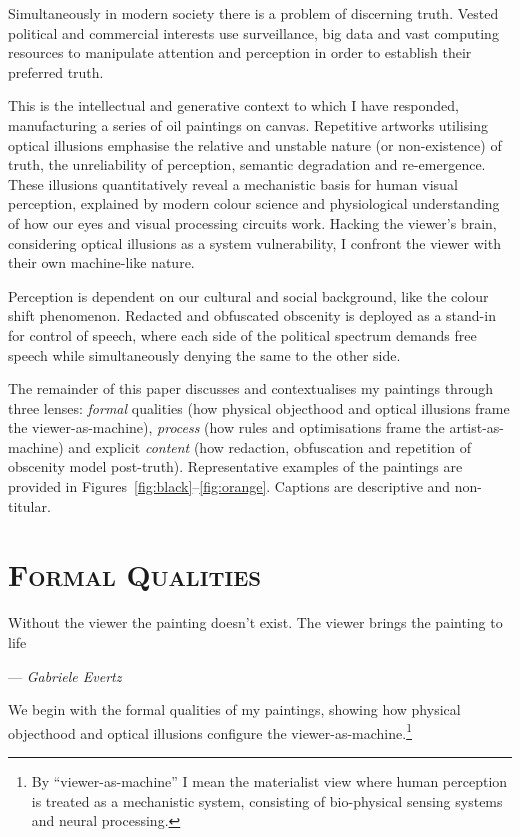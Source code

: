 \documentclass[12pt]{article}
\newcommand{\epigraphsource}[1]{--- {\small{\textit{#1}}}}
\begin{document}
Simultaneously in modern society there is a problem of discerning
truth.\autocite{keyes2004posttruth,mcintyre2018posttruth} Vested
political and commercial interests use surveillance, big data and vast
computing resources to manipulate attention and perception in order to
establish their preferred truth.

This is the intellectual and generative context to which I have
responded, manufacturing a series of oil paintings on
canvas. Repetitive artworks utilising optical illusions emphasise the
relative and unstable nature (or non-existence) of truth, the
unreliability of perception, semantic degradation and
re-emergence. These illusions quantitatively reveal a mechanistic
basis for human visual perception, explained by modern colour science
and physiological understanding of how our eyes and visual processing
circuits work. Hacking the viewer's brain, considering optical
illusions as a system vulnerability, I confront the viewer with their
own machine-like nature.

Perception is dependent on our cultural and social background, like
the colour shift phenomenon. Redacted and obfuscated obscenity is
deployed as a stand-in for control of speech, where each side of the
political spectrum demands free speech while simultaneously denying the
same to the other side.

The remainder of this paper discusses and contextualises my paintings
through three lenses: \emph{formal} qualities (how physical objecthood
and optical illusions frame the viewer-as-machine), \emph{process}
(how rules and optimisations frame the artist-as-machine) and
explicit \emph{content} (how redaction, obfuscation and repetition of
obscenity model post-truth). Representative examples of the paintings
are provided in Figures~\ref{fig:black}--\ref{fig:orange}. Captions
are descriptive and non-titular.

\section{\textsc{Formal Qualities}}
\epigraph{Without the viewer the painting doesn't exist. The viewer brings
the painting to life}{\epigraphsource{Gabriele Evertz}}
  
We begin with the formal qualities of my paintings, showing how
physical objecthood and optical illusions configure the
viewer-as-machine.\footnote{By ``viewer-as-machine'' I mean the
  materialist view where human perception is treated as a mechanistic
  system, consisting of bio-physical sensing systems and neural
  processing.}
\end{document}
